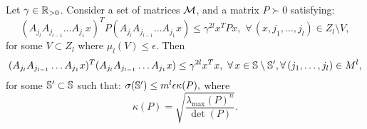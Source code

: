 \begin{theorem}\label{thm:mainTheorem01}
Let $\gamma \in \mathbb{R}_{> 0}$. Consider a set of matrices $\mathcal{M}$, and a matrix $P \succ 0$ satisfying:
\begin{equation}\label{eqn:P0}
(A_{j_l} A_{j_{l-1}} \dots A_{j_1} x)^T P(A_{j_l} A_{j_{l-1}} \dots A_{j_1} x) \leq \gamma^{2l} x^T P x,\,\, \forall\, (x, j_1, \dotsc, j_l) \in Z_l \setminus V,
\end{equation}
for some $V \subset Z_l$ where $\mu_l(V) \leq \epsilon$. Then
\begin{equation*}\label{eqn:thm01-2}
(A_{j_l} A_{j_{l-1}} \dots A_{j_1} x)^T (A_{j_l} A_{j_{l-1}} \dots A_{j_1} x) \leq \gamma^{2l} x^T x,\,\, \forall\, x \in \mathbb{S} \setminus \mathbb{S}', \forall\, (j_1,\dots,j_l) \in M^l,
\end{equation*}
for some $\mathbb{S}' \subset \mathbb{S}$ such that: $\sigma(\mathbb{S}') \leq m^l \epsilon \kappa(P),$
where $$\kappa(P) = \sqrt{\frac{\lambda_{\max}(P)^n}{\det(P)}}.$$
\end{theorem}


